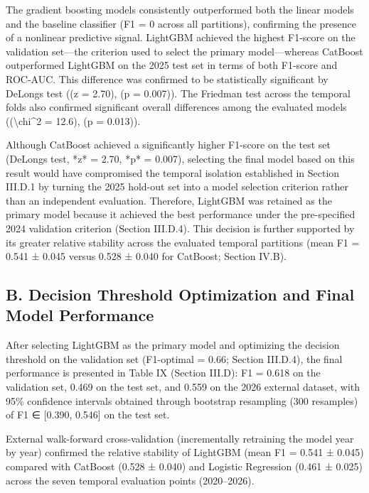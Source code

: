 \documentclass[
  number]{elsarticle}
\begin{document}
The gradient boosting models consistently outperformed both the linear
models and the baseline classifier (F1 = 0 across all partitions),
confirming the presence of a nonlinear predictive signal. LightGBM
achieved the highest F1-score on the validation set---the criterion used
to select the primary model---whereas CatBoost outperformed LightGBM on
the 2025 test set in terms of both F1-score and ROC-AUC. This difference
was confirmed to be statistically significant by
DeLong\textquotesingle s test ((z = 2.70), (p = 0.007)). The Friedman
test across the temporal folds also confirmed significant overall
differences among the evaluated models ((\textbackslash chi\^{}2 =
12.6), (p = 0.013)).

Although CatBoost achieved a significantly higher F1-score on the test
set (DeLong\textquotesingle s test, *z* = 2.70, *p* = 0.007), selecting
the final model based on this result would have compromised the temporal
isolation established in Section III.D.1 by turning the 2025 hold-out
set into a model selection criterion rather than an independent
evaluation. Therefore, LightGBM was retained as the primary model
because it achieved the best performance under the pre-specified 2024
validation criterion (Section III.D.4). This decision is further
supported by its greater relative stability across the evaluated
temporal partitions (mean F1 = 0.541 ± 0.045 versus 0.528 ± 0.040 for
CatBoost; Section IV.B).

\subsection{B. Decision Threshold Optimization and Final Model
Performance}\label{b.-decision-threshold-optimization-and-final-model-performance}

After selecting LightGBM as the primary model and optimizing the
decision threshold on the validation set (F1-optimal = 0.66; Section
III.D.4), the final performance is presented in Table IX (Section
III.D): F1 = 0.618 on the validation set, 0.469 on the test set, and
0.559 on the 2026 external dataset, with 95\% confidence intervals
obtained through bootstrap resampling (300 resamples) of F1 ∈ {[}0.390,
0.546{]} on the test set.

External walk-forward cross-validation (incrementally retraining the
model year by year) confirmed the relative stability of LightGBM (mean
F1 = 0.541 ± 0.045) compared with CatBoost (0.528 ± 0.040) and Logistic
Regression (0.461 ± 0.025) across the seven temporal evaluation points
(2020--2026).
\end{document}
